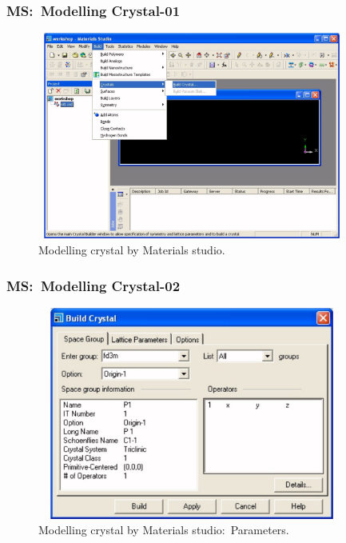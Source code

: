 \frame
{
	\frametitle{\textrm{MS:~Modelling Crystal-01}}
\begin{figure}[h!]
\centering
\vspace*{-0.10in}
\includegraphics[height=2.68in,width=4.00in,viewport=0 0 1090 760,clip]{Figures/MS-New_Project-06.png}
\caption{\tiny \textrm{Modelling crystal by Materials studio.}}%
\label{MS-Modelling-Crystal-01}
\end{figure}
}

\frame
{
	\frametitle{\textrm{MS:~Modelling Crystal-02}}
\begin{figure}[h!]
\centering
\vspace*{-0.15in}
\includegraphics[height=2.75in,width=4.00in,viewport=0 0 1090 814,clip]{Figures/MS-New_Project-07.png}
\caption{\tiny \textrm{Modelling crystal by Materials studio:~Parameters.}}%
\label{MS-Modelling-Crystal-02}
\end{figure}
}

